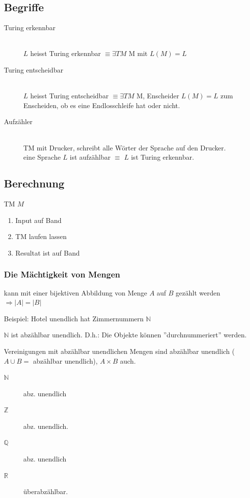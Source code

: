 \subsection{Begriffe}

\begin{description}
	\item[Turing erkennbar] \hfill \\
		$L$ heisst Turing erkennbar $\equiv \exists TM$ M mit $L(M)=L$
	\item[Turing entscheidbar] \hfill \\
		$L$ heisst Turing entscheidbar $\equiv \exists TM$ M, Enscheider $L(M)=L$ zum Enscheiden, ob es eine Endlosschleife hat oder nicht.
	\item[Aufzähler] \hfill \\
		TM mit Drucker, schreibt alle Wörter der Sprache auf den Drucker. \\
		eine Sprache $L$ ist aufzählbar $\equiv$ $L$ ist Turing erkennbar.
\end{description}


\subsection{Berechnung}

TM $M$

\begin{enumerate}
	\item Input auf Band
	\item TM laufen lassen
	\item Resultat ist auf Band
\end{enumerate}

\subsubsection{Die Mächtigkeit von Mengen}

kann mit einer bijektiven Abbildung von Menge $A$ auf $B$ gezählt werden $\Rightarrow |A| =  |B|$

Beispiel: Hotel unendlich hat Zimmernummern $\mathbb{N}$


$\mathbb{N}$ ist abzählbar unendlich. D.h.: Die Objekte können ''durchnummeriert'' werden. 

Vereinigungen mit abzählbar unendlichen Mengen sind abzählbar unendlich ($A \cup B =$ abzählbar unendlich), $A \times B$ auch.

\begin{description}
	\item[$\mathbb{N}$] abz. unendlich
	\item[$\mathbb{Z}$] abz. unendlich.
	
	\item[$\mathbb{Q}$] abz. unendlich
	\item[$\mathbb{R}$] überabzählbar.
\end{description}


